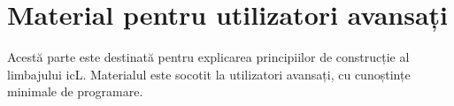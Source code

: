 \part{Material pentru utilizatori avansați}

Acestă parte este destinată pentru explicarea principiilor de construcție al limbajului icL. Materialul este socotit la utilizatori avansați, cu cunoștințe minimale de programare. 
